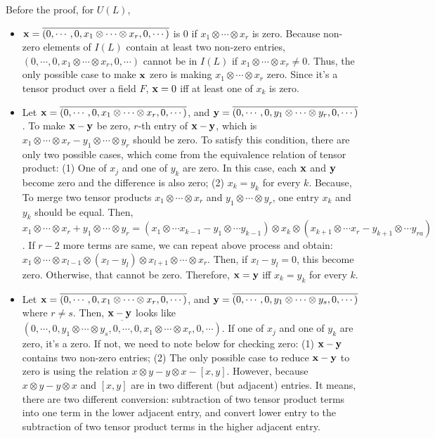 Before the proof, for \(U(L)\),
\begin{itemize}
\item
  \(\mathbf{x} = \overline{(0, \cdots, 0, x_1 \otimes \cdots \otimes x_r, 0, \cdots)}\) is 0 if \(x_1 \otimes \cdots \otimes x_r\) is zero.
  Because non-zero elements of \(I(L)\) contain at least two non-zero entries,
  \((0, \cdots, 0, x_1 \otimes \cdots \otimes x_r, 0, \cdots)\)
  cannot be in \(I(L)\) if \(x_1 \otimes \cdots \otimes x_r \neq 0\).
  Thus, the only possible case to make \(\mathbf{x}\) zero is
  making \(x_1 \otimes \cdots \otimes x_r\) zero.
  Since it's a tensor product over a field \(F\),
  \(\mathbf{x} = 0\) iff at least one of \(x_k\) is zero.
\item
  Let \(\mathbf{x} = \overline{(0, \cdots, 0, x_1 \otimes \cdots \otimes x_r, 0, \cdots)}\),
  and \(\mathbf{y} = \overline{(0, \cdots, 0, y_1 \otimes \cdots \otimes y_r, 0, \cdots)}\).
  To make \(\mathbf{x} - \mathbf{y}\) be zero,
  \(r\)-th entry of \(\mathbf{x} - \mathbf{y}\),
  which is
  \(x_1 \otimes \cdots \otimes x_r - y_1 \otimes \cdots \otimes y_r\)
  should be zero.
  To satisfy this condition, there are only two possible cases,
  which come from the equivalence relation of tensor product:
  (1) One of \(x_j\) and one of \(y_k\) are zero. In this case,
  each \(\mathbf{x}\) and \(\mathbf{y}\) become zero and the difference is
  also zero;
  (2) \(x_k = y_k\) for every \(k\). Because,
  To merge two tensor products
  \(x_1 \otimes \cdots \otimes x_r\)
  and
  \(y_1 \otimes \cdots \otimes y_r\),
  one entry \(x_k\) and \(y_k\) should be equal.
  Then,
  \(x_1 \otimes \cdots \otimes x_r
  + y_1 \otimes \cdots \otimes y_r
  = (x_1 \otimes \cdots x_{k - 1} - y_1 \otimes \cdots y_{k - 1})
  \otimes x_k
  \otimes (x_{k + 1} \otimes \cdots x_{r} - y_{k + 1} \otimes \cdots y_{ra})\).
  If \(r - 2\) more terms are same, we can repeat above process and obtain:
  \(x_1 \otimes \cdots \otimes x_{l - 1} \otimes (x_l - y_l) \otimes x_{l + 1} \otimes \cdots \otimes x_r\).
  Then, if \(x_l - y_l = 0\), this become zero.
  Otherwise, that cannot be zero.
  Therefore, \(\mathbf{x} = \mathbf{y}\) iff \(x_k = y_k\) for every \(k\).
\item
  Let \(\mathbf{x} = \overline{(0, \cdots, 0, x_1 \otimes \cdots \otimes x_r, 0, \cdots)}\),
  and \(\mathbf{y} = \overline{(0, \cdots, 0, y_1 \otimes \cdots \otimes y_s, 0, \cdots)}\) where \(r \neq s\).
  Then, \(\mathbf{x} - \mathbf{y}\) looks like \(\overline{(0, \cdots, 0, y_1 \otimes \cdots \otimes y_s, 0, \cdots, 0, x_1 \otimes \cdots \otimes x_r, 0, \cdots)}\).
  If one of \(x_j\) and one of \(y_k\) are zero, it's a zero.
  If not, we need to note below for checking zero:
  (1) \(\mathbf{x} - \mathbf{y}\) contains two non-zero entries;
  (2) The only possible case to reduce \(\mathbf{x} - \mathbf{y}\) to zero is using the relation \(x \otimes y - y \otimes x - [x, y]\).
  However, because \(x \otimes y - y \otimes x\) and \([x, y]\)
  are in two different (but adjacent) entries.
  It means, there are two different conversion:
  subtraction of two tensor product terms into one term in the lower adjacent entry,
  and convert lower entry to the subtraction of two tensor product terms in the higher adjacent entry.
\end{itemize}

